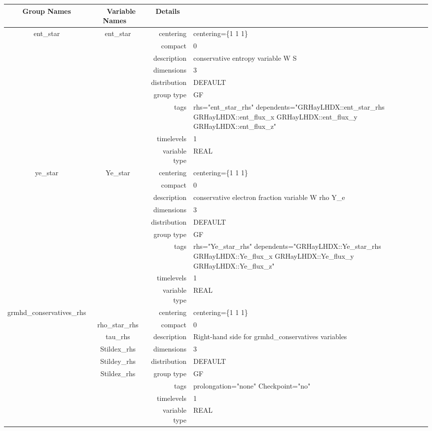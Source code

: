 \documentclass{article}
\begin{document}
\begin{tabular*}{150mm}{|c|c@{\extracolsep{\fill}}|rl|} \hline 
~ {\bf Group Names} ~ & ~ {\bf Variable Names} ~  &{\bf Details} ~ & ~ \\ 
\hline 
ent\_star & ent\_star & centering & centering=\{1 1 1\} \\ 
 &  & compact & 0 \\ 
 &  & description & conservative entropy variable W S \\ 
 &  & dimensions & 3 \\ 
 &  & distribution & DEFAULT \\ 
 &  & group type & GF \\ 
 &  & tags & rhs="ent\_star\_rhs" dependents="GRHayLHDX::ent\_star\_rhs GRHayLHDX::ent\_flux\_x GRHayLHDX::ent\_flux\_y GRHayLHDX::ent\_flux\_z" \\ 
 &  & timelevels & 1 \\ 
 &  & variable type & REAL \\ 
\hline 
ye\_star & Ye\_star & centering & centering=\{1 1 1\} \\ 
 &  & compact & 0 \\ 
 &  & description & conservative electron fraction variable W rho Y\_e \\ 
 &  & dimensions & 3 \\ 
 &  & distribution & DEFAULT \\ 
 &  & group type & GF \\ 
 &  & tags & rhs="Ye\_star\_rhs" dependents="GRHayLHDX::Ye\_star\_rhs GRHayLHDX::Ye\_flux\_x GRHayLHDX::Ye\_flux\_y GRHayLHDX::Ye\_flux\_z" \\ 
 &  & timelevels & 1 \\ 
 &  & variable type & REAL \\ 
\hline 
grmhd\_conservatives\_rhs &  & centering & centering=\{1 1 1\} \\ 
 & rho\_star\_rhs & compact & 0 \\ 
 & tau\_rhs & description & Right-hand side for grmhd\_conservatives variables \\ 
 & Stildex\_rhs & dimensions & 3 \\ 
 & Stildey\_rhs & distribution & DEFAULT \\ 
 & Stildez\_rhs & group type & GF \\ 
 &  & tags & prolongation="none" Checkpoint="no" \\ 
 &  & timelevels & 1 \\ 
 &  & variable type & REAL \\ 

\end{tabular*}
\end{document}
